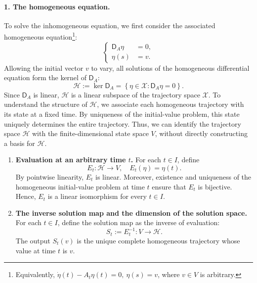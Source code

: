\documentclass[12pt,a4paper,oneside]{book}
\begin{document}
\begin{example}
\begin{solution}
\paragraph{1. The homogeneous equation.}
To solve the inhomogeneous equation, we first consider the associated homogeneous equation\footnote{Equivalently,
$\dot{\eta}(t) - A_t\eta(t)=0,\ \eta(s)=v$, where $v\in V$ is arbitrary.}:
\begin{equation*}
\left\{
    \begin{aligned}
        \mathsf D_A\eta &= 0,\\
        \eta(s) &= v.
    \end{aligned}
    \right.
\end{equation*}
Allowing the initial vector $v$ to vary, all solutions of the homogeneous differential equation form the kernel of $\mathsf D_A$:
\begin{equation*}
    \mathcal H:=\ker\mathsf D_A =
        \left\{
            \eta\in\mathcal X: \mathsf D_A\eta=0
        \right\}.
\end{equation*}
Since $\mathsf D_A$ is linear, $\mathcal H$ is a linear subspace of the trajectory space $\mathcal X$. To understand the
structure of $\mathcal H$, we associate each homogeneous trajectory with its state at a fixed time. By uniqueness of the
initial-value problem, this state uniquely determines the entire trajectory. Thus, we can identify the trajectory space
$\mathcal H$ with the finite-dimensional state space $V$, without directly constructing a basis for $\mathcal H$.

\begin{enumerate}
    \item \textbf{Evaluation at an arbitrary time $t$.} For each $t\in I$, define
    \begin{equation*}
        E_t:\mathcal H\to V,\quad E_t(\eta)=\eta(t).
    \end{equation*}
    By pointwise linearity, $E_t$ is linear. Moreover, existence and uniqueness of the homogeneous initial-value problem
    at time $t$ ensure that $E_t$ is bijective. Hence, $E_t$ is a linear isomorphism for every $t\in I$.

    \item \textbf{The inverse solution map and the dimension of the solution space.} For each $t\in I$, define the solution
        map as the inverse of evaluation:
        \begin{equation*}
            S_t:=E_t^{-1}:V\to\mathcal H.
        \end{equation*}
        The output $S_t(v)$ is the unique complete homogeneous trajectory whose value at time $t$ is $v$.
\end{enumerate}


\end{solution}
\end{example}
\end{document}
